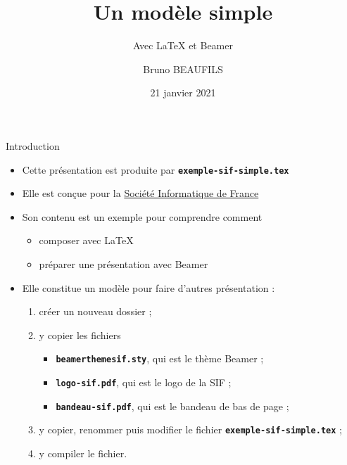 \documentclass[10pt,t]{beamer}
\title[SIF]{Un modèle simple}
\subtitle{Avec \LaTeX{} et Beamer}
\author{Bruno BEAUFILS}
\institute[]{GT Moyens Informatiques}
\date{21 janvier 2021}
\begin{document}
\maketitle


\begin{frame}{Introduction} 

  \begin{itemize}
  \item Cette présentation est produite par \texttt{\textbf{exemple-sif-simple.tex}}
  \item Elle est conçue pour la \href{https://www.societe-informatique-de-france.fr}{Société Informatique de France}
  \item Son contenu est un exemple pour comprendre comment

    \begin{itemize}
    \item composer avec \LaTeX{}
    \item préparer une présentation avec Beamer
    \end{itemize}

  \end{itemize}

  \pause


  \begin{itemize}
  \item Elle constitue un modèle pour faire d'autres présentation :
      
    \begin{enumerate}
    \item créer un nouveau dossier ;
    \item y copier les fichiers 
      
      \begin{itemize}
      \item \texttt{\textbf{beamerthemesif.sty}}, qui est le thème Beamer ;
      \item \texttt{\textbf{logo-sif.pdf}}, qui est le logo de la SIF ;
      \item \texttt{\textbf{bandeau-sif.pdf}}, qui est le bandeau de bas de page ;
      \end{itemize}
      
    \item y copier, renommer puis modifier le fichier \texttt{\textbf{exemple-sif-simple.tex}} ;
    \item y compiler le fichier.
    \end{enumerate}
  \end{itemize}
\end{frame}
\end{document}
